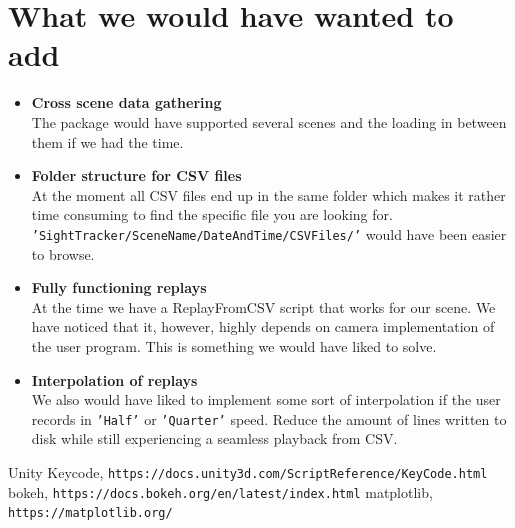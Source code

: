 \documentclass[letterpaper]{article}
\begin{document}
\section{What we would have wanted to add}
\begin{itemize}
\item \textbf{Cross scene data gathering}\\
The package would have supported several scenes and the loading in between them if we had the time.
\item \textbf{Folder structure for CSV files}\\
At the moment all CSV files end up in the same folder which makes it rather time consuming to find the specific file you are looking for.\\
\texttt{'SightTracker/SceneName/DateAndTime/CSVFiles/'} would have been easier to browse.
\item \textbf{Fully functioning replays}\\
At the time we have a ReplayFromCSV script that works for our scene. We have noticed that it, however, highly depends on camera implementation of the user program. This is something we would have liked to solve.
\item \textbf{Interpolation of replays}\\
We also would have liked to implement some sort of interpolation if the user records in \texttt{'Half'} or \texttt{'Quarter'} speed. Reduce the amount of lines written to disk while still experiencing a seamless playback from CSV.
\end{itemize}
\newpage
\begin{thebibliography}{9}
Unity Keycode,
\texttt{https://docs.unity3d.com/ScriptReference/KeyCode.html}
bokeh, 
\texttt{https://docs.bokeh.org/en/latest/index.html}
matplotlib,
\texttt{https://matplotlib.org/}

\end{thebibliography}
\end{document}
